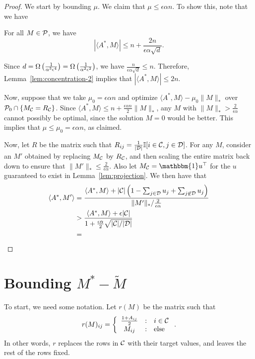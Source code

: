 \documentclass[11pt]{article}
\newcommand{\M}{\tilde{M}}
\newcommand{\Aa}{A^*}
\newcommand{\sD}{\mathcal{D}}
\newcommand{\bi}{\mathbbm{1}}
\begin{document}
\begin{proof}
We start by bounding $\mu$. We claim that $\mu \leq \epsilon \alpha n$. 
To show this, note that we have
\begin{lemma}
\label{lem:concentration-2}
For all $M \in \mathcal{P}$, we have
\[ |\langle \Aa, M\rangle| \leq n + \frac{2n}{\epsilon\alpha\sqrt{d}}. \]
\end{lemma}
Since $d = \Omega\left(\frac{1}{\alpha^3\epsilon^4}\right) = \Omega\left(\frac{1}{\alpha^2\epsilon^2}\right)$, 
we have $\frac{n}{\epsilon\alpha\sqrt{d}} \leq n$. Therefore, Lemma~\ref{lem:concentration-2} 
implies that $|\langle \Aa, M \rangle| \leq 2n$.

Now, suppose that we take $\mu_0 = \epsilon \alpha n$ and optimize $\langle \Aa, M \rangle - \mu_0\|M\|_*$ over 
$\mathcal{P}_0 \cap \{M_{\mathcal{C}} = R_{\mathcal{C}}\}$. Since $\langle \Aa, M \rangle \leq n + \frac{\epsilon \alpha n}{2}\|M\|_*$, 
any $M$ with $\|M\|_* > \frac{2}{\epsilon\alpha}$ cannot possibly be optimal, since the solution $M = 0$ would 
be better. This implies that $\mu \leq \mu_0 = \epsilon \alpha n$, as claimed.


Now, let $R$ be the matrix such that $R_{ij} = \frac{1}{|\sD|}\bI[i \in \sC, j \in \sD]$. For any 
$M$, consider an $M'$ obtained by replacing $M_{\mathcal{C}}$ by $R_{\mathcal{C}}$, and then scaling the entire 
matrix back down to ensure that $\|M'\|_* \leq \frac{2}{\epsilon \alpha}$. Also let $M_{\sC} = \bi u^{\top}$ 
for the $u$ guaranteed to exist in Lemma~\ref{lem:projection}. We then have that
\begin{align}
\langle A^*, M' \rangle &= \frac{\langle A^*, M \rangle + |\sC|\p{1 - \sum_{j \in \sD} u_j + \sum_{j \not\in \sD} u_j}}{\|M'\|_* / \frac{2}{\epsilon\alpha}} \\
 &> \frac{\langle A^*, M \rangle + \epsilon|\sC|}{1 + \frac{\epsilon\alpha}{2}\sqrt{|\sC|/|\sD|}} \\
 &= 
\end{align}

\end{proof}

\section{Bounding $M^* - \M$}
To start, we need some notation. Let $r(M)$ be the matrix such that
\[ r(M)_{ij} = \left\{ \begin{array}{ccl} \frac{1+A_{ij}}{2} & : & i \in \mathcal{C} \\ M_{ij} & : & \text{else} \end{array} \right.. \]
In other words, $r$ replaces the rows in $\mathcal{C}$ with their target values, and 
leaves the rest of the rows fixed.
\end{document}

